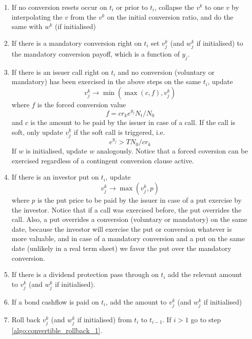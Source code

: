 \begin{enumerate}
  \begin{enumerate}
  \item  for all $k=1,\ldots,K$, $j=1,\ldots,n$:
  \item interpolate $v_j^k$ linearly from the $v_j^\kappa$ on the adjusted conversion ratio $cr'=cr'(cr_k, y_j)$ which
    is always computable as a function of the assumed conversion ratio for $v^k$ and the log equity price $y_j$ for the
    involved reset and dividend protection features.
  \item interpolate $w_j^k$ from $w_j^\kappa$ analoguously, if $w$ is initialised
  \end{enumerate}
\item If no conversion resets occur on $t_i$ or prior to $t_i$, collapse the $v^k$ to one $v$ by interpolating the $v$
  from the $v^k$ on the initial conversion ratio, and do the same with $w^k$ (if initialised)
\item If there is a mandatory conversion right on $t_i$ set $v^k_j$ (and $w^k_j$ if initialised) to the mandatory
  conversion payoff, which is a function of $y_j$.
\item If there is an issuer call right on $t_i$ and no conversion (voluntary or mandatory) has been exercised in the
  above steps on the same $t_i$, update
  $$v_j^k \rightarrow \min(\max(c, f), v_j^k)$$
  where $f$ is the forced conversion value
  $$f = cr_k e^{y_j} N_t/N_0$$
  and $c$ is the amount to be paid by the issuer in case of a call. If the call is soft, only update
  $v_j^k$ if the soft call is triggered, i.e.
  $$e^{y_j} > T N_0 / cr_k$$
  If $w$ is initialised, update $w$ analogously. Notice that a forced coversion can be exercised regardless of a
  contingent conversion clause active.
\item If there is an investor put on $t_i$, update
  $$v_j^k \rightarrow \max( v_j^k, p)$$ where $p$ is the put price to be paid by the issuer in case of a put exercise by
  the investor. Notice that if a call was exercised before, the put overrides the call. Also, a put overrides a
  conversion (voluntary or mandatory) on the same date, because the investor will exercise the put or conversion
  whatever is more valuable, and in case of a mandatory conversion and a put on the same date (unlikely in a real term
  sheet) we favor the put over the mandatory conversion.
\item If there is a dividend protection pass through on $t_i$ add the relevant amount to $v_j^k$ (and $w_j^k$ if
  initialised).
\item If a bond cashflow is paid on $t_i$, add the amount to $v_j^k$ (and $w_j^k$ if initialised)
\item Roll back $v_j^k$ (and $w_j^k$ if initialised) from $t_i$ to $t_{i-1}$. If $i>1$ go to step
  \ref{algo:convertible_rollback_1}.
\end{enumerate}

